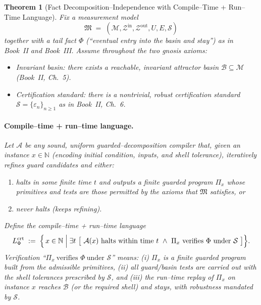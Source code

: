 \documentclass[12pt]{article}
\theoremstyle{definition}
\theoremstyle{plain}
\newtheorem{theorem}{Theorem}[section]
\begin{document}
\begin{theorem}[Fact Decomposition–Independence with Compile–Time + Run–Time Language]
\label{thm:FDI_compile_run}
Fix a measurement model
\[
  \mathfrak M \;=\; (\mathcal M,\mathcal Z^{\mathrm{in}},\mathcal Z^{\mathrm{out}},U,E,\mathcal S)
\]
together with a tail fact \(\Phi\) (“eventual entry into the basin and stay”) as in Book~II and Book~III.
Assume throughout the two gnosis axioms:
\begin{itemize}[itemsep=2pt,leftmargin=2em]
  \item[\textup{(F)}] \emph{Invariant basin:} there exists a reachable, invariant attractor basin \(\mathcal B\subseteq\mathcal M\) (Book~II, Ch.~5).
  \item[\textup{(S)}] \emph{Certification standard:} there is a nontrivial, robust certification standard \(\mathcal S=\{\varepsilon_n\}_{n\ge1}\) as in Book~II, Ch.~6.
\end{itemize}

\paragraph{Compile–time + run–time language.}
Let \(\mathcal A\) be any \emph{sound, uniform} guarded–decomposition compiler that, given an instance \(x\in\mathbb N\) (encoding initial condition, inputs, and shell tolerance), iteratively refines guard candidates and either:
\begin{enumerate}[label=(\alph*),itemsep=1pt,leftmargin=2em]
  \item halts in some finite time \(t\) and outputs a finite guarded program \(\Pi_x\) whose primitives and tests are those permitted by the axioms that \(\mathfrak M\) satisfies, or
  \item never halts (keeps refining).
\end{enumerate}
Define the \emph{compile–time + run–time} language
\[
  L^{\mathrm{crt}}_{\Phi}
  \;:=\;
  \Bigl\{\, x\in\mathbb N \;\Big|\;
     \exists t\ \bigl[\ \mathcal A(x)\ \text{halts within time }t
     \ \wedge\ \Pi_x\ \text{verifies }\Phi\ \text{under }\mathcal S\ \bigr]
  \Bigr\}.
\]
Verification “\(\Pi_x\ \text{verifies }\Phi\ \text{under }\mathcal S\)” means:
(i) \(\Pi_x\) is a finite guarded program built from the admissible primitives,
(ii) all guard/basin tests are carried out with the shell tolerances prescribed by \(\mathcal S\), and
(iii) the run–time replay of \(\Pi_x\) on instance \(x\) reaches \(\mathcal B\) (or the required shell) and stays, with robustness mandated by \(\mathcal S\).


\end{theorem}
\end{document}
